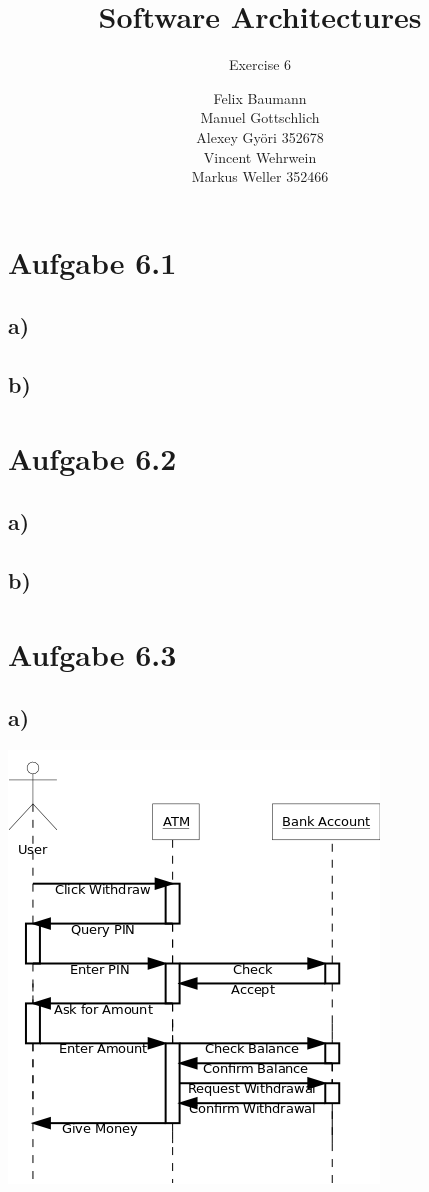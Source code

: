 \documentclass[a4paper,10pt]{scrartcl}[2003/01/01]
\title{Software Architectures}
\subtitle{Exercise 6}
\author{ Felix Baumann \\ Manuel Gottschlich \\  Alexey Gy\"ori 352678 \\ Vincent Wehrwein \\ Markus Weller 352466}
\begin{document}
    \maketitle
    
    \section*{Aufgabe 6.1}
        \subsection*{a)}
        \subsection*{b)}
    \section*{Aufgabe 6.2}
        \subsection*{a)}
        \subsection*{b)}
        \newpage
    \section*{Aufgabe 6.3}
        \subsection*{a)}
        \includegraphics[scale=0.5]{Diagram1}
\end{document}
